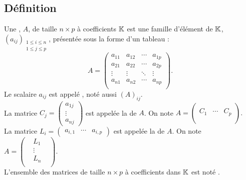 \documentclass{book}
\begin{document}
\subsection{Définition}
\begin{Definition}[Matrice]
Une , $A$,  de taille $n\times p$  à coefficients  $\mathbb{K} $ est une famille d'élément de $\mathbb{K} $, $(a_{ij})_{\substack{1\leq i\leq n\\1\leq j\leq p}}$, présentée sous la forme d'un tableau :
$$ A=\begin{pmatrix}
a_{11} & a_{12} & \cdots & a_{1p}\\
a_{21} & a_{22} & \cdots & a_{2p}\\
\vdots & \vdots & \ddots & \vdots\\
a_{n1} & a_{n2} & \cdots & a_{np}\\
\end{pmatrix}.$$
Le scalaire $a_{ij}$ est appelé , noté aussi $(A)_{ij}$.\\
La matrice $C_j=\begin{pmatrix}
a_{1j}\\
\vdots\\
a_{nj}
\end{pmatrix}$ est appelée la  de $A$. On note $A=\begin{pmatrix}
&  & \\
C_1 & \cdots & C_{p}\\
&  & \\
\end{pmatrix}.$\\
La matrice $L_i=\begin{pmatrix}
a_{i,1}&\cdots&a_{i,p}
\end{pmatrix}$ est appelée la  de $A$. On note $A=\begin{pmatrix}
& L_1 & \\
 & \vdots & \\
&  L_n & \\
\end{pmatrix}.$\\ 
L'ensemble des matrices de taille $n\times p$ à coefficients dans $\mathbb{K}$ est noté .
\end{Definition}
\end{document}
